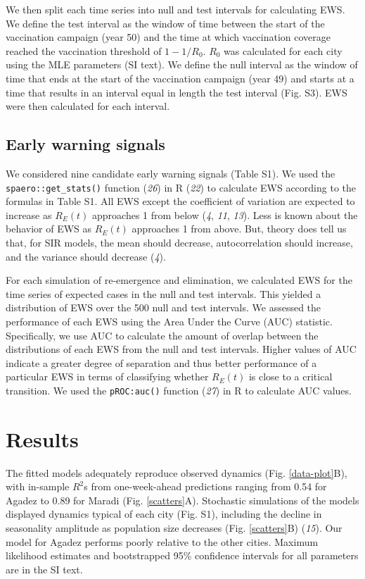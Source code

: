 \documentclass[3p]{elsarticle} %
\begin{document}
We then split each time series into null and test intervals for
calculating EWS. We define the test interval as the window of time
between the start of the vaccination campaign (year 50) and the time at
which vaccination coverage reached the vaccination threshold of
\(1 - 1/R_0\). \(R_0\) was calculated for each city using the MLE
parameters (SI text). We define the null interval as the window of time
that ends at the start of the vaccination campaign (year 49) and starts
at a time that results in an interval equal in length the test interval
(Fig. S3). EWS were then calculated for each interval.

\hypertarget{early-warning-signals}{%
\subsection{Early warning signals}\label{early-warning-signals}}

We considered nine candidate early warning signals (Table S1). We used
the \texttt{spaero::get\_stats()} function (\emph{26}) in R (\emph{22})
to calculate EWS according to the formulas in Table S1. All EWS except
the coefficient of variation are expected to increase as \(R_E(t)\)
approaches 1 from below (\emph{4}, \emph{11}, \emph{13}). Less is known
about the behavior of EWS as \(R_E(t)\) approaches 1 from above. But,
theory does tell us that, for SIR models, the mean should decrease,
autocorrelation should increase, and the variance should decrease
(\emph{4}).

For each simulation of re-emergence and elimination, we calculated EWS
for the time series of expected cases in the null and test intervals.
This yielded a distribution of EWS over the 500 null and test intervals.
We assessed the performance of each EWS using the Area Under the Curve
(AUC) statistic. Specifically, we use AUC to calculate the amount of
overlap between the distributions of each EWS from the null and test
intervals. Higher values of AUC indicate a greater degree of separation
and thus better performance of a particular EWS in terms of classifying
whether \(R_E(t)\) is close to a critical transition. We used the
\texttt{pROC:auc()} function (\emph{27}) in R to calculate AUC values.

\hypertarget{results}{%
\section{Results}\label{results}}

The fitted models adequately reproduce observed dynamics (Fig.
\ref{data-plot}B), with in-sample \(R^2\)s from one-week-ahead
predictions ranging from 0.54 for Agadez to 0.89 for Maradi (Fig.
\ref{scatters}A). Stochastic simulations of the models displayed
dynamics typical of each city (Fig. S1), including the decline in
seasonality amplitude as population size decreases (Fig.
\ref{scatters}B) (\emph{15}). Our model for Agadez performs poorly
relative to the other cities. Maximum likelihood estimates and
bootstrapped 95\% confidence intervals for all parameters are in the SI
text.
\end{document}
